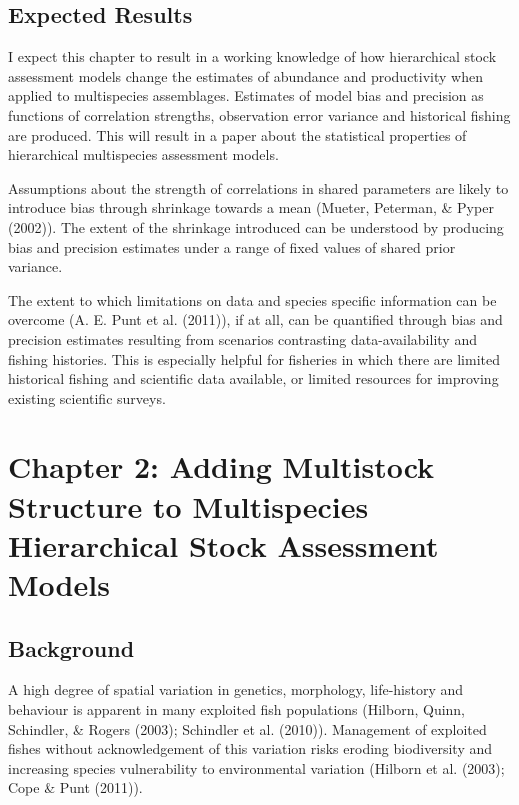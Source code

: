 \documentclass[12pt,]{scrartcl}
\begin{document}
\subsection{Expected Results}\label{expected-results}

I expect this chapter to result in a working knowledge of how
hierarchical stock assessment models change the estimates of abundance
and productivity when applied to multispecies assemblages. Estimates of
model bias and precision as functions of correlation strengths,
observation error variance and historical fishing are produced. This
will result in a paper about the statistical properties of hierarchical
multispecies assessment models.

Assumptions about the strength of correlations in shared parameters are
likely to introduce bias through shrinkage towards a mean (Mueter,
Peterman, \& Pyper (2002)). The extent of the shrinkage introduced can
be understood by producing bias and precision estimates under a range of
fixed values of shared prior variance.

The extent to which limitations on data and species specific information
can be overcome (A. E. Punt et al. (2011)), if at all, can be quantified
through bias and precision estimates resulting from scenarios
contrasting data-availability and fishing histories. This is especially
helpful for fisheries in which there are limited historical fishing and
scientific data available, or limited resources for improving existing
scientific surveys.

\section{Chapter 2: Adding Multistock Structure to Multispecies
Hierarchical Stock Assessment
Models}\label{chapter-2-adding-multistock-structure-to-multispecies-hierarchical-stock-assessment-models}

\subsection{Background}\label{background-2}

A high degree of spatial variation in genetics, morphology, life-history
and behaviour is apparent in many exploited fish populations (Hilborn,
Quinn, Schindler, \& Rogers (2003); Schindler et al. (2010)). Management
of exploited fishes without acknowledgement of this variation risks
eroding biodiversity and increasing species vulnerability to
environmental variation (Hilborn et al. (2003); Cope \& Punt (2011)).
\end{document}
